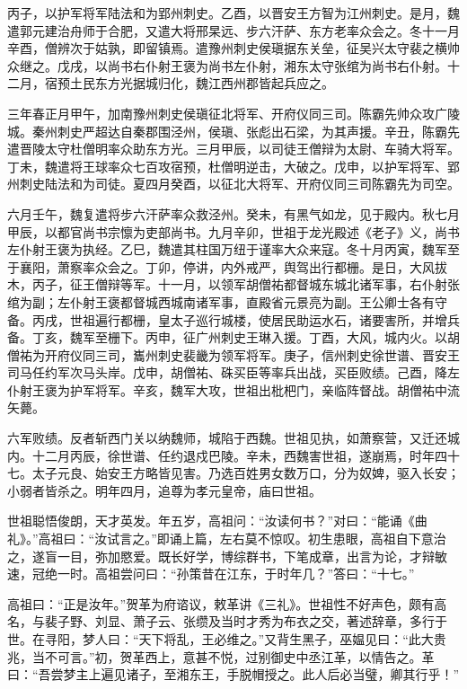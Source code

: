 \documentclass[12pt,UTF8]{ctexbook}
\begin{document}
丙子，以护军将军陆法和为郢州刺史。乙酉，以晋安王方智为江州刺史。是月，魏遣郭元建治舟师于合肥，又遣大将邢杲远、步六汗萨、东方老率众会之。冬十一月辛酉，僧辨次于姑孰，即留镇焉。遣豫州刺史侯瑱据东关垒，征吴兴太守裴之横帅众继之。戊戌，以尚书右仆射王褒为尚书左仆射，湘东太守张绾为尚书右仆射。十二月，宿预土民东方光据城归化，魏江西州郡皆起兵应之。

三年春正月甲午，加南豫州刺史侯瑱征北将军、开府仪同三司。陈霸先帅众攻广陵城。秦州刺史严超达自秦郡围泾州，侯瑱、张彪出石梁，为其声援。辛丑，陈霸先遣晋陵太守杜僧明率众助东方光。三月甲辰，以司徒王僧辩为太尉、车骑大将军。丁未，魏遣将王球率众七百攻宿预，杜僧明逆击，大破之。戊申，以护军将军、郢州刺史陆法和为司徒。夏四月癸酉，以征北大将军、开府仪同三司陈霸先为司空。

六月壬午，魏复遣将步六汗萨率众救泾州。癸未，有黑气如龙，见于殿内。秋七月甲辰，以都官尚书宗懔为吏部尚书。九月辛卯，世祖于龙光殿述《老子》义，尚书左仆射王褒为执经。乙巳，魏遣其柱国万纽于谨率大众来寇。冬十月丙寅，魏军至于襄阳，萧察率众会之。丁卯，停讲，内外戒严，舆驾出行都栅。是日，大风拔木，丙子，征王僧辩等军。十一月，以领军胡僧祐都督城东城北诸军事，右仆射张绾为副；左仆射王褒都督城西城南诸军事，直殿省元景亮为副。王公卿士各有守备。丙戌，世祖遍行都栅，皇太子巡行城楼，使居民助运水石，诸要害所，并增兵备。丁亥，魏军至栅下。丙申，征广州刺史王琳入援。丁酉，大风，城内火。以胡僧祐为开府仪同三司，巂州刺史裴畿为领军将军。庚子，信州刺史徐世谱、晋安王司马任约军次马头岸。戊申，胡僧祐、硃买臣等率兵出战，买臣败绩。己酉，降左仆射王褒为护军将军。辛亥，魏军大攻，世祖出枇杷门，亲临阵督战。胡僧祐中流矢薨。

六军败绩。反者斩西门关以纳魏师，城陷于西魏。世祖见执，如萧察营，又迁还城内。十二月丙辰，徐世谱、任约退戍巴陵。辛未，西魏害世祖，遂崩焉，时年四十七。太子元良、始安王方略皆见害。乃选百姓男女数万口，分为奴婢，驱入长安；小弱者皆杀之。明年四月，追尊为孝元皇帝，庙曰世祖。

世祖聪悟俊朗，天才英发。年五岁，高祖问：“汝读何书？”对曰：“能诵《曲礼》。”高祖曰：“汝试言之。”即诵上篇，左右莫不惊叹。初生患眼，高祖自下意治之，遂盲一目，弥加愍爱。既长好学，博综群书，下笔成章，出言为论，才辩敏速，冠绝一时。高祖尝问曰：“孙策昔在江东，于时年几？”答曰：“十七。”

高祖曰：“正是汝年。”贺革为府谘议，敕革讲《三礼》。世祖性不好声色，颇有高名，与裴子野、刘显、萧子云、张缵及当时才秀为布衣之交，著述辞章，多行于世。在寻阳，梦人曰：“天下将乱，王必维之。”又背生黑子，巫媪见曰：“此大贵兆，当不可言。”初，贺革西上，意甚不悦，过别御史中丞江革，以情告之。革曰：“吾尝梦主上遍见诸子，至湘东王，手脱帽授之。此人后必当璧，卿其行乎！”
\end{document}
